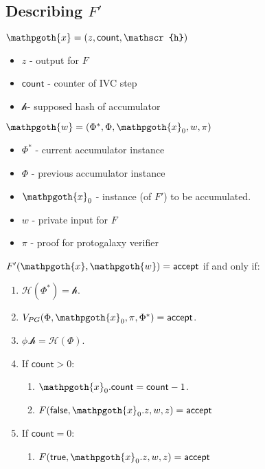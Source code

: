 \documentclass[11pt]{article} %
\newcommand{\acc}{\ensuremath{\mathsf{accept}}\xspace}
\newcommand{\hash}{\ensuremath{\mathcal{H}}\xspace}
\newcommand{\prf}{\ensuremath{\mathsf{\pi}}\xspace}
\newcommand{\inst}{\ensuremath{\phi}\xspace}
\newcommand{\wit}{\ensuremath{\mathsf{\omega}}\xspace}
\newcommand{\instFprime}{\ensuremath{\mathpgoth{x}}\xspace}
\newcommand{\witFprime}{\ensuremath{\mathpgoth{w}}\xspace}
\newcommand{\acchash}{\ensuremath{\mathscr{h}}\xspace}
\newcommand{\cnt}{\ensuremath{\mathsf{count}}\xspace}
\newcommand{\rel}{\ensuremath{\mathcal{R}}\xspace}
\newcommand{\instt}{\ensuremath{\Phi^*}\xspace}
\newcommand{\insttbase}{\ensuremath{\Phi}\xspace}
\newcommand{\true}{\ensuremath{\mathsf{true}}\xspace}
\newcommand{\false}{\ensuremath{\mathsf{false}}\xspace}
\begin{document}
\subsection{Describing $F'$}
$\instFprime=(z,\cnt,\acchash)$
\begin{itemize}
 \item $z$ - output for $F$
\item $\cnt$ - counter of IVC step
\item\acchash - supposed hash of accumulator
\end{itemize}
$\witFprime=(\instt,\insttbase,\instFprime_0,w,\prf)$
\begin{itemize}
\item$\instt$ - current accumulator instance
\item$\insttbase$ - previous accumulator instance
\item$\instFprime_0$ - instance (of $F'$) to be accumulated.
\item$w$ - private input for $F$
\item$\prf$ - proof for protogalaxy verifier
\end{itemize}


$F'(\instFprime,\witFprime)=\acc$ if and only if:
\begin{enumerate}
 \item  $\hash(\instt)=\acchash$.
\item $V_{PG}(\insttbase, \instFprime_0, \prf, \instt )= \acc$.
\item $\inst.\acchash=\hash(\insttbase)$.
\item If $\cnt>0$:
\begin{enumerate}
    \item $\instFprime_0.\cnt=\cnt-1$.
    \item $F(\false,\instFprime_0.z, w,z)=\acc$
    \end{enumerate}
    
\item If $\cnt=0$:
\begin{enumerate}
    \item $F(\true, \instFprime_0.z, w,z)=\acc$

    \end{enumerate}
\end{enumerate}
 \renewcommand{\acc}{\insttbase}
 \newcommand{\relfin}{\ensuremath{\rel_{\mathsf{fin}}}\xspace}
 \newcommand{\instfin}{\ensuremath{\inst_{\mathsf{fin}}}\xspace}
 \newcommand{\witfin}{\ensuremath{\wit_{\mathsf{fin}}}\xspace}
 \newcommand{\emptyacc}{\ensuremath{\acc_{\text{\calligra{empty}}}}\xspace}
\end{document}
